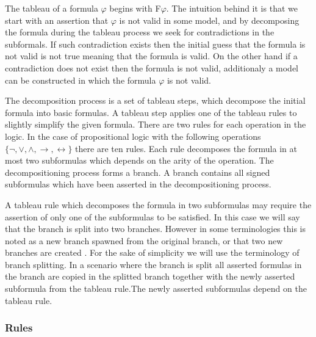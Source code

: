 \documentclass{article}
\begin{document}
The tableau of a formula $\varphi$ begins with F$\varphi$. The intuition behind it is that we start with an assertion that $\varphi$ is not valid in some model, and by decomposing the formula during the tableau process we seek for contradictions in the subformals. If such contradiction exists then the initial guess that the formula is not valid is not true meaning that the formula is valid. On the other hand if a contradiction does not exist then the formula is not valid, additionaly a model can be constructed in which the formula $\varphi$ is not valid.

The decomposition process is a set of tableau steps, which decompose the initial formula into basic formulas. A tableau step applies one of the tableau rules to slightly simplify the given formula. There are two rules for each operation in the logic. In the case of propositional logic with the following operations $\{ \neg, \vee, \wedge, \rightarrow, \leftrightarrow \}$ there are ten rules. Each rule decomposes the formula in at most two subformulas which depends on the arity of the operation. The decompositioning process forms a branch. A branch contains all signed subformulas which have been asserted in the decompositioning process.

A tableau rule which decomposes the formula in two subformulas may require the assertion of only one of the subformulas to be satisfied. In this case we will say that the branch is split into two branches. However in some terminologies this is noted as a new branch spawned from the original branch, or that two new branches are created . For the sake of simplicity we will use the terminology of branch splitting. In a scenario where the branch is split all asserted formulas in the branch are copied in the splitted branch together with the newly asserted subformula from the tableau rule.The newly asserted subformulas depend on the tableau rule.

	\subsubsection{Rules}
\end{document}
